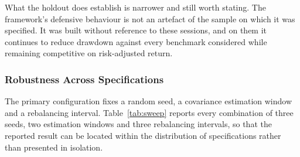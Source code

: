 What the holdout does establish is narrower and still worth stating. The framework's
defensive behaviour is not an artefact of the sample on which it was specified. It was
built without reference to these sessions, and on them it continues to reduce drawdown
against every benchmark considered while remaining competitive on risk-adjusted return.

\subsubsection{Robustness Across Specifications}
\label{sec:robust}

The primary configuration fixes a random seed, a covariance estimation window and a
rebalancing interval. Table~\ref{tab:sweep} reports every combination of three seeds, two
estimation windows and three rebalancing intervals, so that the reported result can be
located within the distribution of specifications rather than presented in isolation.


